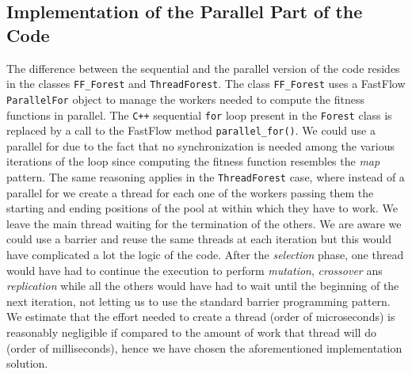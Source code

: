 \documentclass[10pt]{article}
\numberwithin{equation}{section}
\begin{document}
\subsection{Implementation of the Parallel Part of the Code}
The difference between the sequential and the parallel version of the code resides in the classes \verb|FF_Forest| and \verb|ThreadForest|. The class \verb|FF_Forest| uses a FastFlow \verb|ParallelFor| object to manage the workers needed to compute the fitness functions in parallel. The \verb|C++| sequential \verb|for| loop present in the \verb|Forest| class is replaced by a call to the FastFlow method \verb|parallel_for()|. We could use a parallel for due to the fact that no synchronization is needed among the various iterations of the loop since computing the fitness function resembles the \emph{map} pattern. The same reasoning applies in the \verb|ThreadForest| case, where instead of a parallel for we create a thread for each one of the workers passing them the starting and ending positions of the pool at within which they have to work. We leave the main thread waiting for the termination of the others. We are aware we could use a barrier and reuse the same threads at each iteration but this would have complicated a lot the logic of the code. After the \emph{selection} phase, one thread would have had to continue the execution to perform \emph{mutation}, \emph{crossover} ans \emph{replication} while all the others would have had to wait until the beginning of the next iteration, not letting us to use the standard barrier programming pattern. We estimate that the effort needed to create a thread (order of microseconds) is reasonably negligible if compared to the amount of work that thread will do (order of milliseconds), hence we have chosen the aforementioned implementation solution.
\end{document}

